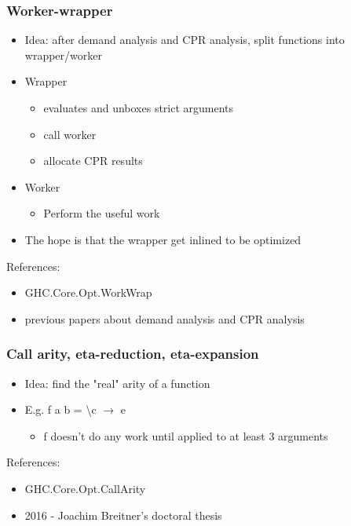 \documentclass[aspectratio=169]{beamer}
\begin{document}
\begin{frame}
  \frametitle{Worker-wrapper}
  \begin{itemize}
    \item Idea: after demand analysis and CPR analysis, split functions into wrapper/worker
    \item Wrapper
      \begin{itemize}
        \item evaluates and unboxes strict arguments
        \item call worker
        \item allocate CPR results
      \end{itemize}
    \item Worker
      \begin{itemize}
        \item Perform the useful work
      \end{itemize}
    \item The hope is that the wrapper get inlined to be optimized
  \end{itemize}

  References:
  \begin{itemize}
    \item GHC.Core.Opt.WorkWrap
    \item previous papers about demand analysis and CPR analysis
  \end{itemize}
\end{frame}

\begin{frame}
  \frametitle{Call arity, eta-reduction, eta-expansion}
  \begin{itemize}
    \item Idea: find the "real" arity of a function
    \item E.g. f a b = \textbackslash c $\rightarrow$ e
      \begin{itemize}
        \item f doesn't do any work until applied to at least 3 arguments
      \end{itemize}
  \end{itemize}

  References:
  \begin{itemize}
    \item GHC.Core.Opt.CallArity
    \item 2016 - Joachim Breitner's doctoral thesis
  \end{itemize}
\end{frame}
\end{document}
